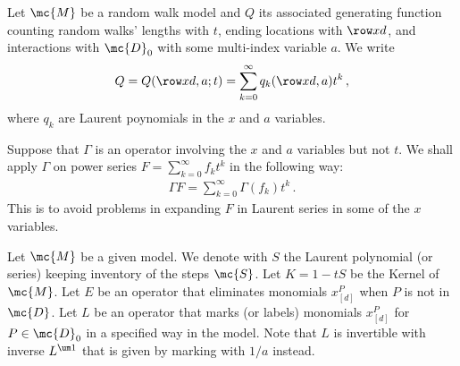 \begin{definition} Let $\mc{M}$ be a random walk model and $Q$ its associated generating function counting random walks' lengths with $t$, ending locations with $\row xd$, and interactions with $\mc{D}_0$ with some multi-index variable $a$. We write
\begin{align}
	Q = Q(\row xd,a;t) = \sum_{k=0}^{\infty} q_k(\row xd, a)t^k\,,
\end{align}
where $q_k$ are Laurent poynomials in the $x$ and $a$ variables. 
\end{definition}
\begin{definition} Suppose that $\Gamma$ is an operator involving the $x$ and $a$ variables but not $t$. We shall apply $\Gamma$ on power series $F = \sum_{k=0}^\infty f_k t^k$ in the following way:
\begin{align}
	\Gamma F = \sum_{k=0}^\infty \Gamma (f_k) t^k\,.
\end{align}
This is to avoid problems in expanding $F$ in Laurent series in some of the $x$ variables.
\end{definition}

\begin{definition} Let $\mc{M}$ be a given model. We denote with $S$ the Laurent polynomial (or series) keeping inventory of the steps $\mc{S}$. Let $K = 1-tS$ be the Kernel of $\mc{M}$. Let $E$ be an operator that eliminates monomials $x_{[d]}^P$ when $P$ is not in $\mc{D}$. Let $L$ be an operator that marks (or labels) monomials $x_{[d]}^P$ for $P \in \mc{D}_0$ in a specified way in the model. Note that $L$ is invertible with inverse $L^{\um 1}$ that is given by marking with $1/a$ instead.
\end{definition}

